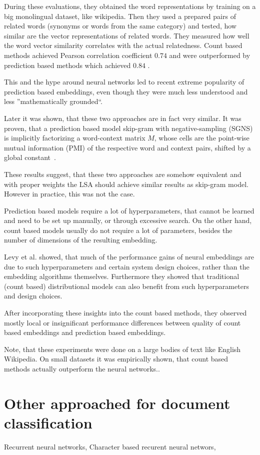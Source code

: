     During these evaluations, they obtained the word representations by training on a big monolingual dataset, like wikipedia.
    Then they used a prepared pairs of related words (synonyms or words from the same category) and tested,
    how similar are the vector representations of related words. 
    They measured how well the word vector similarity correlates with the actual relatedness. 
    Count based methods achieved Pearson correlation coefficient $0.74$ and were outperformed by prediction based methods which achieved $0.84$ \cite{baroni2014don}.
    
    This and the hype around neural networks led to recent extreme popularity of prediction based embeddings,
    even though they were much less understood and less ''mathematically grounded``.
    
    Later it was shown, that these two approaches are in fact very similar.
    It was proven, that a prediction based model skip-gram with negative-sampling (SGNS) 
    is implicitly factorizing a word-context matrix $M$,
    whose cells are the point-wise mutual information (PMI) of the respective word and context pairs, 
    shifted by a global constant~\cite{levy2014neural}. %
    
    These results suggest, that these two approaches are somehow equivalent and with proper weights the LSA should achieve similar results as skip-gram model. 
    However in practice, this was not the case.
    
    Prediction based models require a lot of hyperparameters, that cannot be learned and need to be set up manually,
    or through excessive search.
    On the other hand, count based models usually do not require a lot of parameters, besides the number of dimensions of the resulting embedding. 
    
    Levy et al. \cite{levy2015improving} %
    showed, that much  of  the  performance  gains  of  neural embeddings  are  due  to such hyperparameters and certain system design choices, rather than the embedding algorithms themselves. 
    Furthermore they showed that traditional (count based) distributional models
    can also benefit from such hyperparameters and design choices.
    
    After incorporating these insights into the count based methods, 
    they observed mostly local or insignificant performance differences between quality of count based embeddings and prediction based embeddings.
    
    Note, that these experiments were done on a large bodies of text like English Wikipedia.   
    On small datasets it was empirically shown, that count based methods actually outperform the neural networks.\cite{altszyler2016comparative}. %
    
    
\section{Other approached for document classification}
    
    Recurrent neural networks,
    Character based recurent neural networs, 

\* %
